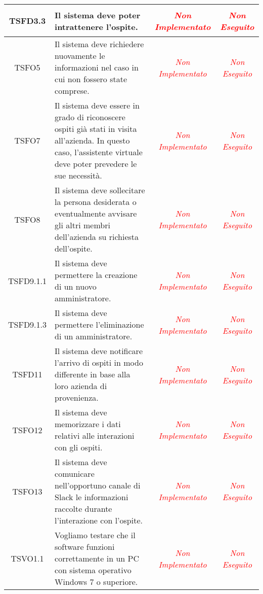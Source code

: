 \begin{longtable}{|c|>{}m{8cm}|c|c|}
\hypertarget{TSFD3.3}{TSFD3.3} & Il sistema deve poter intrattenere l'ospite. & \textcolor{red}{\textit{Non Implementato}} & \textcolor{red}{\textit{Non Eseguito}}\\ \hline
\hypertarget{TSFO5}{TSFO5} & Il sistema deve richiedere nuovamente le informazioni nel caso in cui non fossero state comprese. & \textcolor{red}{\textit{Non Implementato}} & \textcolor{red}{\textit{Non Eseguito}}\\ \hline
\hypertarget{TSFO7}{TSFO7} & Il sistema deve essere in grado di riconoscere ospiti già stati in visita all'azienda. In questo caso, l'assistente virtuale deve poter prevedere le sue necessità. & \textcolor{red}{\textit{Non Implementato}} & \textcolor{red}{\textit{Non Eseguito}}\\ \hline
\hypertarget{TSFO8}{TSFO8} & Il sistema deve sollecitare la persona desiderata o eventualmente avvisare gli altri membri dell'azienda su richiesta dell'ospite. & \textcolor{red}{\textit{Non Implementato}} & \textcolor{red}{\textit{Non Eseguito}}\\ \hline
\hypertarget{TSFD9.1.1}{TSFD9.1.1} & Il sistema deve permettere la creazione di un nuovo amministratore. & \textcolor{red}{\textit{Non Implementato}} & \textcolor{red}{\textit{Non Eseguito}}\\ \hline
\hypertarget{TSFD9.1.3}{TSFD9.1.3} & Il sistema deve permettere l'eliminazione di un amministratore. & \textcolor{red}{\textit{Non Implementato}} & \textcolor{red}{\textit{Non Eseguito}}\\ \hline
\hypertarget{TSFD11}{TSFD11} & Il sistema deve notificare l'arrivo di ospiti in modo differente in base alla loro azienda di provenienza. & \textcolor{red}{\textit{Non Implementato}} & \textcolor{red}{\textit{Non Eseguito}}\\ \hline
\hypertarget{TSFO12}{TSFO12} & Il sistema deve memorizzare i dati relativi alle interazioni con gli ospiti. & \textcolor{red}{\textit{Non Implementato}} & \textcolor{red}{\textit{Non Eseguito}}\\ \hline
\hypertarget{TSFO13}{TSFO13} & Il sistema deve comunicare nell'opportuno canale di Slack le informazioni raccolte durante l'interazione con l'ospite. & \textcolor{red}{\textit{Non Implementato}} & \textcolor{red}{\textit{Non Eseguito}}\\ \hline
\hypertarget{TSVO1.1}{TSVO1.1} & Vogliamo testare che il software funzioni correttamente in un PC con sistema operativo Windows 7 o superiore.
 & \textcolor{red}{\textit{Non Implementato}} & \textcolor{red}{\textit{Non Eseguito}}\\ \hline

\end{longtable}
